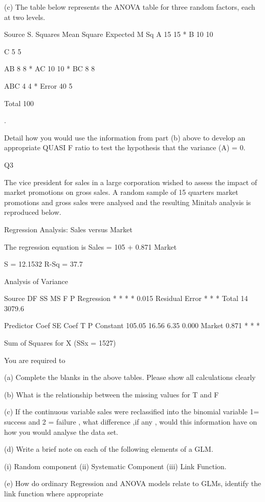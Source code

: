 (c) The table below represents the ANOVA table for three random factors, each at two levels.

Source
S. Squares
Mean Square
Expected M Sq
A
15
15
*
B
10
10

C
  5
  5

AB
  8
  8
*
AC
10
10
*
BC
  8
  8

ABC
  4
  4
*
Error
40
  5

Total
100



.

Detail how you would use the information from part (b) above  to develop an appropriate QUASI F ratio to test the hypothesis that the variance (A) = 0.


Q3

The vice president for sales in a large corporation wished to assess the impact of market promotions on gross sales. A random sample of 15 quarters market promotions and gross sales were analysed and the resulting Minitab analysis is reproduced below.




Regression Analysis: Sales versus Market 

The regression equation is
Sales = 105 + 0.871 Market





S = 12.1532   R-Sq = 37.7%


Analysis of Variance

Source          DF      SS      MS     F      P
Regression       *       *       *      *  0.015
Residual Error   *       *       *
Total           14  3079.6



Predictor    Coef  SE Coef     T      P
Constant   105.05    16.56  6.35  0.000
Market     0.871       *      *      *

Sum of Squares for X (SSx = 1527)

You are required to 

(a)	Complete the blanks in the above tables. Please show all calculations clearly

(b) 	What is the relationship between the missing values for T and F 


(c) 	If  the continuous variable sales  were  reclassified into the binomial variable 1= success and 2 = failure , what difference ,if any , would this information have on how you would analyse the data set.

(d)	Write a brief note on each of the following elements of a GLM.

(i) Random component
(ii) Systematic Component
(iii) Link Function.

(e)	How do ordinary Regression and ANOVA models relate to GLMs, identify the link function where appropriate





